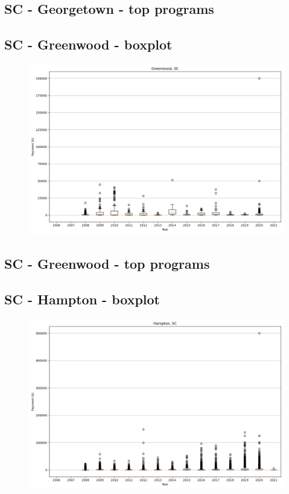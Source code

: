 \subsection*{SC - Georgetown - top programs}

\newpage
\subsection*{SC - Greenwood - boxplot}
\begin{figure}[h]
\centering
\includegraphics[width=7in]{../output/boxplots/counties/Greenwood-SC_boxplot.png}
\end{figure}


\subsection*{SC - Greenwood - top programs}

\newpage
\subsection*{SC - Hampton - boxplot}
\begin{figure}[h]
\centering
\includegraphics[width=7in]{../output/boxplots/counties/Hampton-SC_boxplot.png}
\end{figure}


